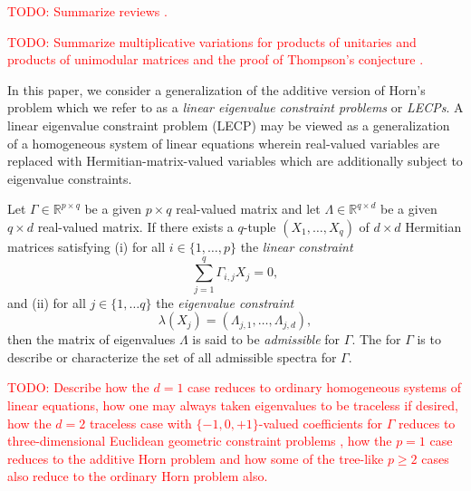\documentclass[notitlepage, 10pt]{article}
\begin{document}
\textcolor{red}{TODO: Summarize reviews \cite{fulton2000eigenvalues,knutson2000symplectic,fulton2000eigenvalues,bhatia2001linear}.}

\textcolor{red}{TODO: Summarize multiplicative variations for products of unitaries \cite{belkale2008quantum,belkale2016multiplicative} and products of unimodular matrices and the proof of Thompson's conjecture \cite{klyachko2000random}.}

In this paper, we consider a generalization of the additive version of Horn's problem which we refer to as a \textit{linear eigenvalue constraint problems} or \textit{LECPs}.
A linear eigenvalue constraint problem (LECP) may be viewed as a generalization of a homogeneous system of linear equations wherein real-valued variables are replaced with Hermitian-matrix-valued variables which are additionally subject to eigenvalue constraints.
\begin{prob}
    Let $\Gamma \in \mathbb R^{p \times q}$ be a given $p \times q$ real-valued matrix and let $\Lambda \in \mathbb R^{q \times d}$ be a given $q \times d$ real-valued matrix.
    If there exists a $q$-tuple $(X_1, \ldots, X_q)$ of $d\times d$ Hermitian matrices satisfying (i) for all $i \in \{1,\ldots, p\}$ the \textit{linear constraint}
    \begin{equation}
        \sum_{j=1}^{q} \Gamma_{i,j} X_j = 0,
    \end{equation}
    and (ii) for all $j \in \{1, \ldots q\}$ the \textit{eigenvalue constraint} 
    \begin{equation}
        \lambda(X_j) = (\Lambda_{j,1}, \ldots, \Lambda_{j, d}),
    \end{equation}
    then the matrix of eigenvalues $\Lambda$ is said to be \textit{admissible} for $\Gamma$.
    The  for $\Gamma$ is to describe or characterize the set of all admissible spectra for $\Gamma$.
\end{prob}

\textcolor{red}{TODO: Describe how the $d=1$ case reduces to ordinary homogeneous systems of linear equations, how one may always taken eigenvalues to be traceless if desired, how the $d=2$ traceless case with $\{-1,0,+1\}$-valued coefficients for $\Gamma$ reduces to three-dimensional Euclidean geometric constraint problems \cite{sitharam2018handbook} \cite{alfakih1998embeddability}, how the $p=1$ case reduces to the additive Horn problem and how some of the tree-like $p\geq 2$ cases also reduce to the ordinary Horn problem also.}
\end{document}
